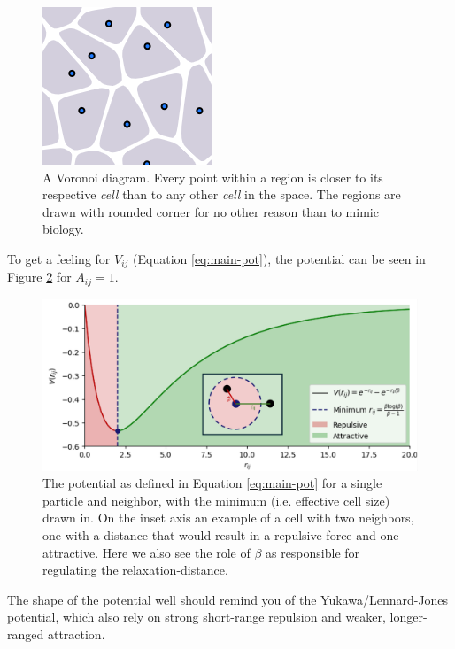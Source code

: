 \begin{figure}[H]
    \centering
    \includegraphics[width=0.3\linewidth]{chapters//Theory//figures/voronoi_explanation.png}
    \caption{A Voronoi diagram. Every point within a region is closer to its respective \textit{cell} than to any other \textit{cell} in the space. The regions are drawn with rounded corner for no other reason than to mimic biology.}
    \label{fig:voronoi-explanation}
\end{figure}
To get a feeling for $V_{ij}$ (Equation \ref{eq:main-pot}), the potential can be seen in Figure \ref{fig:potential} for $A_{ij}=1$.
\begin{figure}[H]
    \centering
    \includegraphics[width=1.\linewidth]{chapters/Theory/figures/potential_annotated.png}
    \caption{The potential as defined in Equation \ref{eq:main-pot} for a single particle and neighbor, with the minimum (i.e. effective cell size) drawn in. On the inset axis an example of a cell with two neighbors, one with a distance that would result in a repulsive force and one attractive. Here we also see the role of $\beta$ as responsible for regulating the relaxation-distance.}
    \label{fig:potential}
\end{figure}

The shape of the potential well should remind you of the Yukawa/Lennard-Jones potential, which also rely on strong short-range repulsion and weaker, longer-ranged attraction.\\

